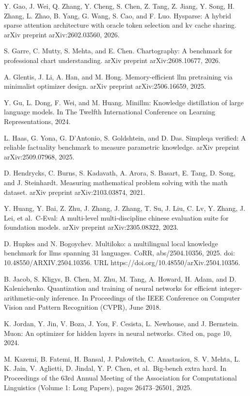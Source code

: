 Y. Gao, J. Wei, Q. Zhang, Y. Cheng, S. Chen, Z. Tang, Z. Jiang, Y. Song,
H. Zhang, L. Zhao, B. Yang, G. Wang, S. Cao, and F. Luo. Hysparse: A
hybrid sparse attention architecture with oracle token selection and kv
cache sharing. arXiv preprint arXiv:2602.03560, 2026.

S. Garre, C. Mutty, S. Mehta, and E. Chen. Chartography: A benchmark for
professional chart understanding. arXiv preprint arXiv:2608.10677, 2026.

A. Glentis, J. Li, A. Han, and M. Hong. Memory-efficient llm pretraining
via minimalist optimizer design. arXiv preprint arXiv:2506.16659, 2025.

Y. Gu, L. Dong, F. Wei, and M. Huang. Minillm: Knowledge distillation of
large language models. In The Twelfth International Conference on
Learning Representations, 2024.

L. Haas, G. Yona, G. D'Antonio, S. Goldshtein, and D. Das. Simpleqa
verified: A reliable factuality benchmark to measure parametric
knowledge. arXiv preprint arXiv:2509.07968, 2025.

D. Hendrycks, C. Burns, S. Kadavath, A. Arora, S. Basart, E. Tang, D.
Song, and J. Steinhardt. Measuring mathematical problem solving with the
math dataset. arXiv preprint arXiv:2103.03874, 2021.

Y. Huang, Y. Bai, Z. Zhu, J. Zhang, J. Zhang, T. Su, J. Liu, C. Lv, Y.
Zhang, J. Lei, et al.~C-Eval: A multi-level multi-discipline chinese
evaluation suite for foundation models. arXiv preprint arXiv:2305.08322,
2023.

D. Hupkes and N. Bogoychev. Multiloko: a multilingual local knowledge
benchmark for llms spanning 31 languages. CoRR, abs/2504.10356, 2025.
doi: 10.48550/ARXIV.2504.10356. URL
https://doi.org/10.48550/arXiv.2504.10356.

B. Jacob, S. Kligys, B. Chen, M. Zhu, M. Tang, A. Howard, H. Adam, and
D. Kalenichenko. Quantization and training of neural networks for
efficient integer-arithmetic-only inference. In Proceedings of the IEEE
Conference on Computer Vision and Pattern Recognition (CVPR), June 2018.

K. Jordan, Y. Jin, V. Boza, J. You, F. Cesista, L. Newhouse, and J.
Bernstein. Muon: An optimizer for hidden layers in neural networks.
Cited on, page 10, 2024.

M. Kazemi, B. Fatemi, H. Bansal, J. Palowitch, C. Anastasiou, S. V.
Mehta, L. K. Jain, V. Aglietti, D. Jindal, Y. P. Chen, et al.~Big-bench
extra hard. In Proceedings of the 63rd Annual Meeting of the Association
for Computational Linguistics (Volume 1: Long Papers), pages
26473--26501, 2025.

